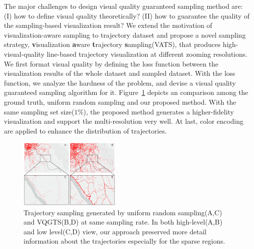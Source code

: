 %





The major challenges to design visual quality guaranteed sampling method are:
(I) how to define visual quality theoretically? (II) how to guarantee the quality of the sampling-based visualization result?
We extend the motivation of visualization-aware sampling to trajectory dataset and propose a novel sampling strategy, \textbf{v}isualization \textbf{a}ware \textbf{t}rajectory \textbf{s}ampling(VATS), that produces high-visual-quality line-based trajectory visualization at different zooming resolutions. 
We first format visual quality by defining the loss function between the visualization results of the whole dataset and sampled dataset.
With the loss function, we analyze the hardness of the problem, and devise a visual quality guaranteed sampling algorithm for it.
Figure~\ref{fig:compare} depicts an comparison among the ground truth,  uniform random sampling and our proposed method. With the same sampling set size($1\%$), the proposed method generates a higher-fidelity visualization and support the multi-resolution very well.   
At last, color encoding are applied to enhance the distribution of trajectories. 

\begin{figure}[t]
	\centering
	\includegraphics[width=0.44\textwidth]{pictures/introduction/effectiveness.pdf}
	\vspace{-3mm}
	\caption{Trajectory sampling generated by uniform random sampling(A,C) and VQGTS(B,D) at same sampling rate. In both high-level(A,B) and low level(C,D) view, our approach preserved more detail information about the trajectories especially for the sparse regions.}
	\vspace{-5mm}
	\label{fig:compare}
\end{figure}

